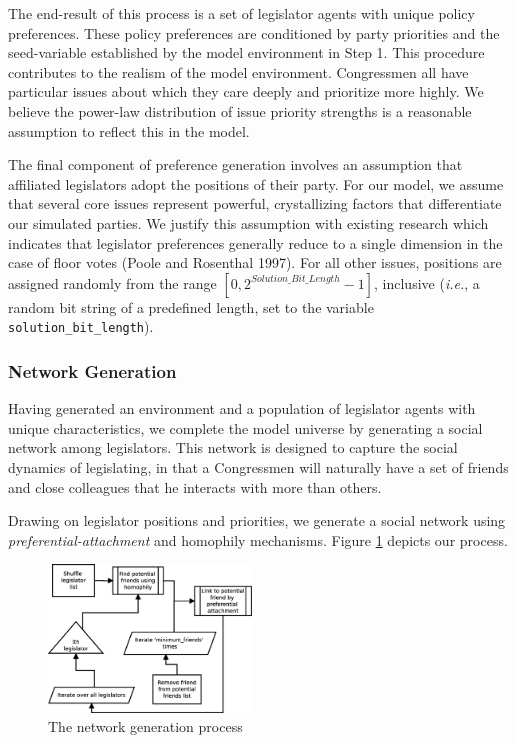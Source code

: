 \documentclass[pdftex,12pt]{llncs}
\begin{document}
The end-result of this process is a set of legislator agents with unique policy preferences. 
These policy preferences are conditioned by party priorities and the seed-variable established by the model environment in Step 1. 
This procedure contributes to the realism of the model environment. 
Congressmen all have particular issues about which they care deeply and prioritize more highly. 
We believe the power-law distribution of issue priority strengths is a reasonable assumption to reflect this in the model.

The final component of preference generation involves an assumption that affiliated legislators adopt the positions of their party.
For our model, we assume that several core issues represent powerful, crystallizing factors that differentiate our simulated parties.  
We justify this assumption with existing research which indicates that legislator preferences generally reduce to a single dimension in the case of floor votes (Poole and Rosenthal 1997). 
For all other issues, positions are assigned randomly from the range $[0, 2^{Solution\_Bit\_Length} - 1]$, inclusive (\textit{i.e.}, a random bit string of a predefined length, set to the variable \texttt{solution\_bit\_length}).

\subsubsection{Network Generation}
Having generated an environment and a population of legislator agents with unique characteristics, we complete the model universe by generating a social network among legislators. 
This network is designed to capture the social dynamics of legislating, in that a Congressmen will naturally have a set of friends and close colleagues that he interacts with more than others. 

Drawing on legislator positions and priorities, we generate a social network using \textit{preferential-attachment} and homophily mechanisms.
Figure \ref{networkgeneration} depicts our process. 

\begin{figure}
  \includegraphics[width=0.48\textwidth]{networkProcess.eps}
 \caption[ ]{The network generation process}
 \label{networkgeneration}
\end{figure}
\end{document}

